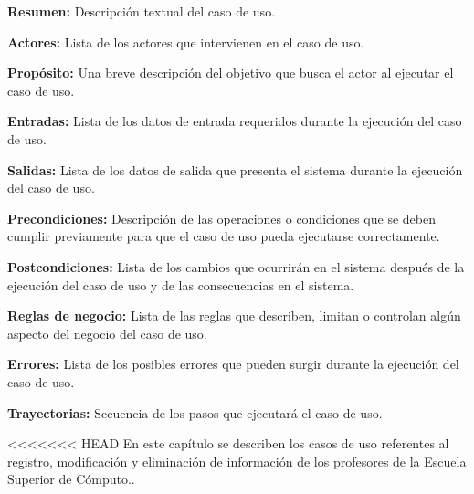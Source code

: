 \begin{objetivos}
	\item {\bf Resumen:} Descripción textual del caso de uso.
	\item {\bf Actores:} Lista de los actores que intervienen en el caso de uso.
	\item {\bf Propósito:} Una breve descripción del objetivo que busca el actor al ejecutar el caso de uso.
	\item {\bf Entradas:} Lista de los datos de entrada requeridos durante la ejecución del caso de uso.
	\item {\bf Salidas:} Lista de los datos de salida que presenta el sistema durante la ejecución del caso de uso.
	\item {\bf Precondiciones:} Descripción de las operaciones o condiciones que se deben cumplir previamente para que el caso de uso pueda ejecutarse correctamente.
	\item {\bf Postcondiciones:} Lista de los cambios que ocurrirán en el sistema después de la ejecución del caso de uso y de las consecuencias en el sistema.
	\item {\bf Reglas de negocio:} Lista de las reglas que describen, limitan o controlan algún aspecto del negocio del caso de uso.
	\item {\bf Errores:} Lista de los posibles errores que pueden surgir durante la ejecución del caso de uso.
	\item {\bf Trayectorias:} Secuencia de los pasos que ejecutará el caso de uso.
\end{objetivos}


<<<<<<< HEAD
En este capítulo se describen los casos de uso referentes al registro, modificación y eliminación de información de los profesores de la Escuela Superior de Cómputo.. \bigskip

